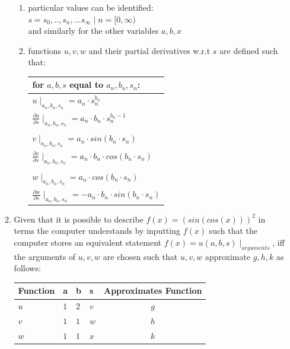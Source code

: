 \documentclass[preprint,12pt]{elsarticle}
\begin{document}
\begin{enumerate}
\begin{enumerate}
\begin{enumerate}
\item
particular values can be identified: \\
$s = s_0,..,s_n,...s_{\infty} \mid n=[0,\infty)$ \\ 
and similarly for the other variables $a,b,x$ \\
\item
functions $u,v,w$ and their partial derivatives w.r.t $s$ are defined such that: \\
\begin{tabular}{l}
for $a, b, s$ equal to $a_n, b_n, s_n$: \\ \hline
$u \mid _{a_n, b_n, s_n} = a_n \cdot s_n^{b_n}$ \\
$\frac{\partial{u}}{\partial{s}} \mid _{a_n, b_n, s_n} = a_n \cdot b_n \cdot s_n^{b_n - 1}$ \\
\\
$v \mid _{a_n, b_n, s_n} = a_n \cdot sin(b_n \cdot s_n)$ \\
$\frac{\partial{v}}{\partial{s}} \mid _{a_n, b_n, s_n} = a_n \cdot b_n \cdot cos(b_n \cdot s_n)$ \\ 
\\
$w \mid _{a_n, b_n, s_n} = a_n \cdot cos(b_n \cdot s_n)$ \\
$\frac{\partial{w}}{\partial{s}} \mid _{a_n, b_n, s_n} = -a_n \cdot b_n \cdot sin(b_n \cdot s_n)$\\
\end{tabular} 
\end{enumerate}
\item 
\label{abcvalues}
Given that it is possible to describe $f(x) = (sin(cos(x)))^2$ in terms the computer understands by inputting
$f(x)$ such that the computer stores an equivalent statement $f(x) = u(a, b, s) \mid_{arguments}$,
iff the arguments of $u,v,w$ are chosen such that $u,v,w$ approximate $g,h,k$ as follows:\\
\begin{tabular}{l l l l | c}
	Function & a & b & s & Approximates Function\\ \hline 
	$u$ & $1$ & $2$ & $v$ & $g$\\ \hline 
	$v$ & $1$ & $1$ & $w$ & $h$\\ \hline 
	$w$ & $1$ & $1$ & $x$ & $k$\\ \hline 	
\end{tabular}
\end{enumerate} 


\end{enumerate}
\end{document}
